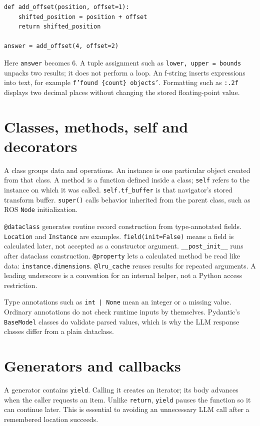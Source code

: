 \documentclass[11pt,a4paper]{book}
\begin{document}
\begin{lstlisting}[numbers=none]
def add_offset(position, offset=1):
    shifted_position = position + offset
    return shifted_position

answer = add_offset(4, offset=2)
\end{lstlisting}
Here \texttt{answer} becomes 6. A tuple assignment such as
\texttt{lower, upper = bounds} unpacks two results; it does not perform a loop.
An f-string inserts expressions into text, for example
\texttt{f'found \{count\} objects'}. Formatting such as \texttt{:.2f} displays
two decimal places without changing the stored floating-point value.

\section{Classes, methods, self and decorators}
A class groups data and operations. An instance is one particular object created
from that class. A method is a function defined inside a class; \texttt{self}
refers to the instance on which it was called. \texttt{self.tf\_buffer} is that
navigator's stored transform buffer. \texttt{super()} calls behavior inherited
from the parent class, such as ROS \texttt{Node} initialization.

\texttt{@dataclass} generates routine record construction from type-annotated
fields. \texttt{Location} and \texttt{Instance} are examples.
\texttt{field(init=False)} means a field is calculated later, not accepted as a
constructor argument. \texttt{\_\_post\_init\_\_} runs after dataclass construction.
\texttt{@property} lets a calculated method be read like data:
\texttt{instance.dimensions}. \texttt{@lru\_cache} reuses results for repeated
arguments. A leading underscore is a convention for an internal helper, not a
Python access restriction.

Type annotations such as \texttt{int | None} mean an integer or a missing value.
Ordinary annotations do not check runtime inputs by themselves. Pydantic's
\texttt{BaseModel} classes do validate parsed values, which is why the LLM
response classes differ from a plain dataclass.

\section{Generators and callbacks}
A generator contains \texttt{yield}. Calling it creates an iterator; its body
advances when the caller requests an item. Unlike \texttt{return}, \texttt{yield}
pauses the function so it can continue later. This is essential to avoiding an
unnecessary LLM call after a remembered location succeeds.
\end{document}
